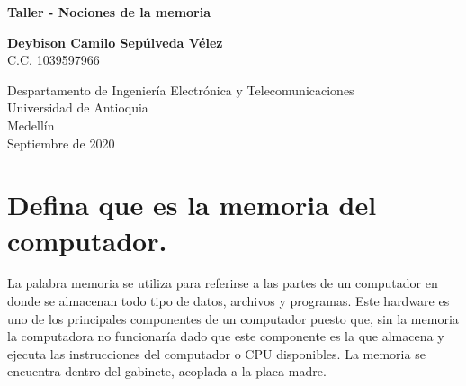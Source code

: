 \documentclass{article}
\begin{document}
\begin{titlepage}
    \begin{center}
        \vspace*{1cm}
            
        \Huge
        \textbf{Taller - Nociones de la memoria }
            
        \vspace{0.5cm}
      
            
        \vspace{1.5cm}
            
        \textbf{Deybison Camilo Sepúlveda Vélez}\\
             \LARGE
        C.C. 1039597966
            
        \vfill
            
        \vspace{0.8cm}
            
        \Large
        Despartamento de Ingeniería Electrónica y Telecomunicaciones\\
        Universidad de Antioquia\\
        Medellín\\
        Septiembre de 2020
            
    \end{center}
\end{titlepage}

\tableofcontents

\section{Defina que es la memoria del computador.}
La palabra memoria se utiliza para referirse a las partes de un computador en donde se almacenan todo tipo de datos, archivos y programas. Este hardware es uno de los principales componentes de un computador puesto que, sin la memoria la computadora no funcionaría dado que este componente es la que almacena y ejecuta las instrucciones del computador o CPU disponibles. La memoria se encuentra dentro del gabinete, acoplada a la placa madre.
\end{document}
